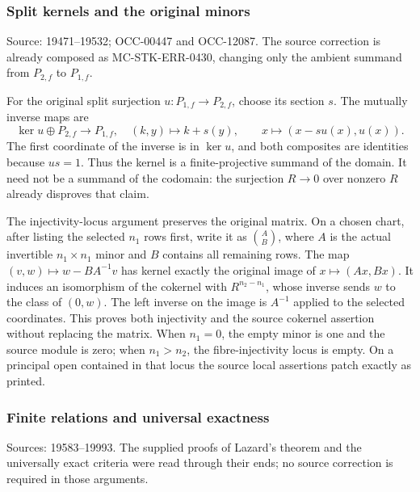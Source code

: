 \subsubsection{Split kernels and the original minors}\label{algebra-proof-010-split-kernels-and-the-original-minors}

Source: 19471--19532; OCC-00447 and OCC-12087. The source correction is already composed as MC-STK-ERR-0430, changing only the ambient summand from \(P_{2,f}\) to \(P_{1,f}\).

For the original split surjection \(u:P_{1,f}\to P_{2,f}\), choose its section \(s\). The mutually inverse maps are \[
\ker u\oplus P_{2,f}\longrightarrow P_{1,f},\quad(k,y)\mapsto k+s(y),
\qquad
x\longmapsto(x-su(x),u(x)).
\] The first coordinate of the inverse is in \(\ker u\), and both composites are identities because \(us=1\). Thus the kernel is a finite-projective summand of the domain. It need not be a summand of the codomain: the surjection \(R\to0\) over nonzero \(R\) already disproves that claim.

The injectivity-locus argument preserves the original matrix. On a chosen chart, after listing the selected \(n_1\) rows first, write it as \(\binom A B\), where \(A\) is the actual invertible \(n_1\times n_1\) minor and \(B\) contains all remaining rows. The map \((v,w)\mapsto w-BA^{-1}v\) has kernel exactly the original image of \(x\mapsto(Ax,Bx)\). It induces an isomorphism of the cokernel with \(R^{n_2-n_1}\), whose inverse sends \(w\) to the class of \((0,w)\). The left inverse on the image is \(A^{-1}\) applied to the selected coordinates. This proves both injectivity and the source cokernel assertion without replacing the matrix. When \(n_1=0\), the empty minor is one and the source module is zero; when \(n_1>n_2\), the fibre-injectivity locus is empty. On a principal open contained in that locus the source local assertions patch exactly as printed.

\subsubsection{Finite relations and universal exactness}\label{algebra-proof-010-finite-relations-and-universal-exactness}

Sources: 19583--19993. The supplied proofs of Lazard's theorem and the universally exact criteria were read through their ends; no source correction is required in those arguments.

